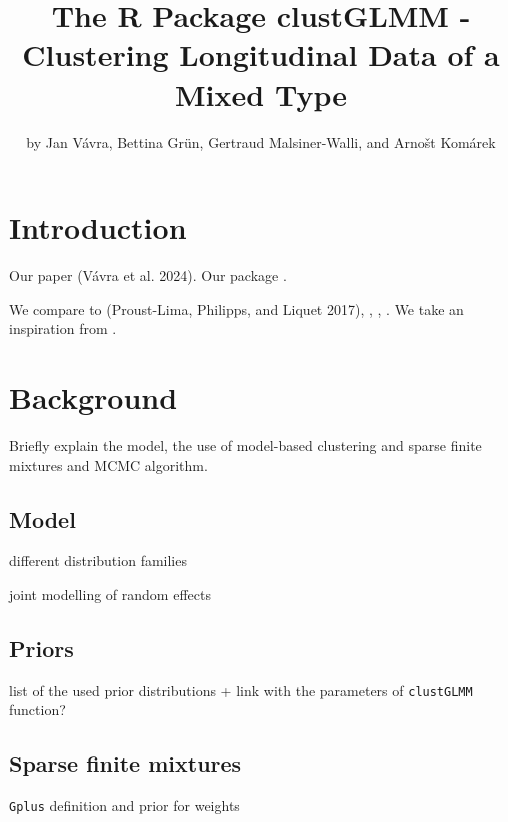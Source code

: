 \title{The R Package clustGLMM - Clustering Longitudinal Data of a Mixed Type}


\author{by Jan Vávra, Bettina Grün, Gertraud Malsiner-Walli, and Arnošt Komárek}

\maketitle


\section{Introduction}\label{introduction}

Our paper (Vávra et al. 2024). Our package .

We compare to  (Proust-Lima, Philipps, and Liquet 2017), , , . We take an inspiration from .

\section{Background}\label{background}

Briefly explain the model, the use of model-based clustering and sparse finite mixtures and MCMC algorithm.

\subsection{Model}\label{model}

different distribution families

joint modelling of random effects

\subsection{Priors}\label{priors}

list of the used prior distributions + link with the parameters of \texttt{clustGLMM} function?

\subsection{Sparse finite mixtures}\label{sparse-finite-mixtures}

\texttt{Gplus} definition and prior for weights

